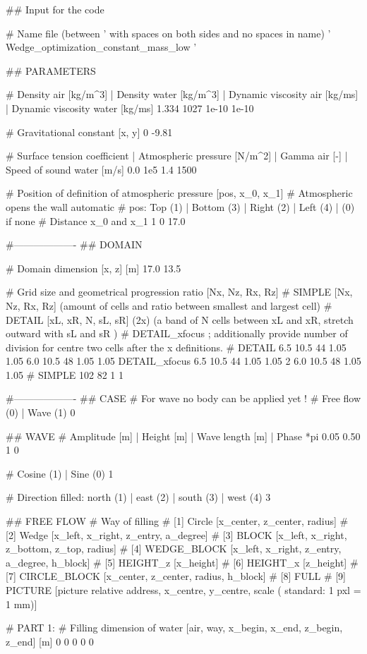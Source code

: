 ## Input for the code

# Name file (between ' with spaces on both sides and no spaces in name)
' Wedge_optimization_constant_mass_low '

## PARAMETERS

# Density air [kg/m^3] | Density water [kg/m^3] | Dynamic viscosity air [kg/ms] | Dynamic viscosity water [kg/ms]
1.334 1027 1e-10 1e-10

# Gravitational constant [x, y]
0 -9.81

# Surface tension coefficient | Atmospheric pressure [N/m^2] | Gamma air [-]	| Speed of sound water [m/s]
0.0 	1e5 	1.4		1500

# Position of definition of atmospheric pressure [pos, x_0, x_1]
# Atmospheric opens the wall automatic
# pos: Top (1)	| Bottom (3)	| Right (2)		| Left (4) | (0) if none
# Distance x_0 and x_1
1 0 17.0

#-------------------
## DOMAIN

# Domain dimension [x, z] [m]
17.0 13.5

# Grid size and geometrical progression ratio [Nx, Nz, Rx, Rz]
# SIMPLE [Nx, Nz, Rx, Rz] (amount of cells and ratio between smallest and largest cell)
# DETAIL [xL, xR, N, sL, sR] (2x) (a band of N cells between xL and xR, stretch outward with sL and sR )
# DETAIL_xfocus ; additionally provide number of division for centre two cells after the x definitions.
# DETAIL 6.5 10.5 44 1.05 1.05 6.0 10.5 48 1.05 1.05
DETAIL_xfocus 6.5 10.5 44 1.05 1.05 2 6.0 10.5 48 1.05 1.05
# SIMPLE 102 82 1 1

#-------------------
## CASE
# For wave no body can be applied yet !
# Free flow (0)	| Wave (1)
0

## WAVE
# Amplitude [m] | Height [m]	| Wave length [m]	| Phase *pi
0.05 	0.50		1		0

# Cosine (1)	| Sine (0)
1

# Direction filled: north (1)	| east (2)	|	south (3)	| west (4)
3

## FREE FLOW
# Way of filling
# [1] Circle        [x_center, z_center, radius]
# [2] Wedge         [x_left, x_right, z_entry, a_degree]
# [3] BLOCK 		[x_left, x_right, z_bottom, z_top, radius]
# [4] WEDGE_BLOCK   [x_left, x_right, z_entry, a_degree, h_block]
# [5] HEIGHT_z      [x_height]
# [6] HEIGHT_x      [z_height]
# [7] CIRCLE_BLOCK  [x_center, z_center, radius, h_block]
# [8] FULL
# [9] PICTURE		[picture relative address, x_centre, y_centre, scale ( standard: 1 pxl = 1 mm)]

# PART 1:
# Filling dimension of water [air, way, x_begin, x_end, z_begin, z_end] [m]
0 0 0 0 0

